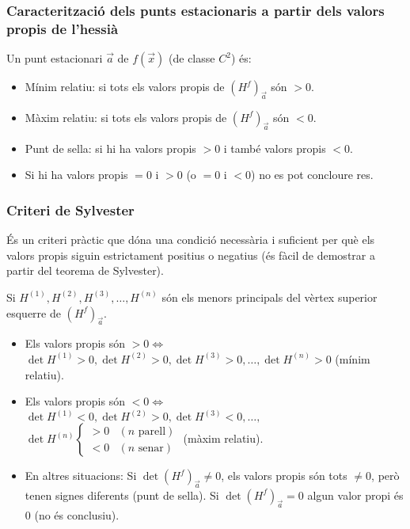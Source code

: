 \subsubsection*{Caracterització dels punts estacionaris a partir dels valors propis de l'hessià}
Un punt estacionari $\vec{a}$ de $f(\vec{x})$ (de classe $C^{2}$) és:
\begin{itemize}
    \item Mínim relatiu: si tots els valors propis de $(H^{f})_{\vec{a}}$ són $>0$.
    \item Màxim relatiu: si tots els valors propis de $(H^{f})_{\vec{a}}$ són $<0$.
    \item Punt de sella: si hi ha valors propis $>0$ i també valors propis $<0$.
    \item Si hi ha valors propis $=0$ i $>0$ (o $=0$ i $<0$) no es pot concloure res.
\end{itemize}

\subsubsection*{Criteri de Sylvester}
És un criteri pràctic que dóna una condició necessària i suficient per què els valors propis siguin estrictament positius o negatius (és fàcil de demostrar a partir del teorema de Sylvester).

Si $H^{(1)}, H^{(2)}, H^{(3)}, \dots, H^{(n)}$ són els menors principals del vèrtex superior esquerre de $(H^{f})_{\vec{a}}$.
\begin{itemize}
    \item Els valors propis són $>0 \Leftrightarrow$
        \subitem $\det H^{(1)} > 0, \det H^{(2)} > 0,  \det H^{(3)} > 0, \dots, \det H^{(n)} > 0$ (mínim relatiu).
    \item Els valors propis són $<0 \Leftrightarrow$
        \subitem $\det H^{(1)} < 0, \det H^{(2)} > 0,  \det H^{(3)} < 0, \dots,$
        \subitem $\det H^{(n)}\begin{cases} >0 & (n \text{ parell}) \\ <0 & (n \text{ senar}) \end{cases}$ (màxim relatiu).
    \item En altres situacions:
        \subitem Si $\det (H^{f})_{\vec{a}} \neq 0$, els valors propis són tots $\neq 0$, però tenen signes diferents (punt de sella).
        \subitem Si $\det (H^{f})_{\vec{a}} = 0$ algun valor propi és $0$ (no és conclusiu).
\end{itemize}
